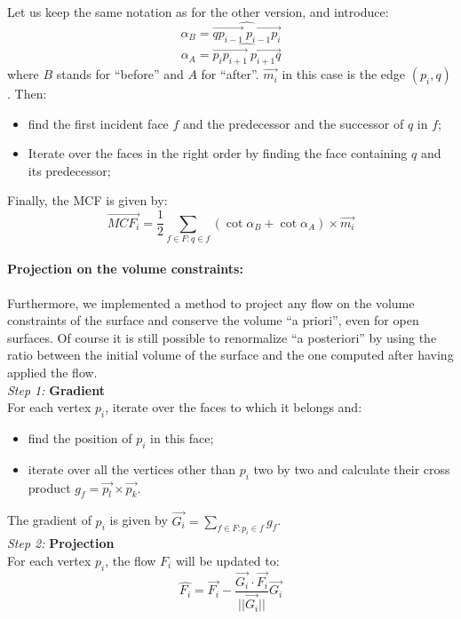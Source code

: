 \documentclass{article}
\begin{document}
Let us keep the same notation as for the other version, and introduce:
\begin{equation*}
  \alpha_B = \widehat{\overrightarrow{q p_{i-1}} ~ \overrightarrow{p_{i-1} p_{i}}}
\end{equation*}
\begin{equation*}
  \alpha_A = \widehat{\overrightarrow{p_i p_{i+1}} ~ \overrightarrow{p_{i+1} q}}
\end{equation*}
where $B$ stands for ``before'' and $A$ for ``after''. $\overrightarrow{m_i}$ in
this case is the edge $(p_i, q)$. Then:
\begin{itemize}
  \item find the first incident face $f$ and the predecessor and the successor of $q$ in $f$;
  \item Iterate over the faces in the right order by finding the face containing $q$ and its predecessor;
\end{itemize}
Finally, the MCF is given by:
\begin{equation*}
  \overrightarrow{MCF_i} = \frac{1}{2} \sum_{f \in F : q \in f} (\cot{\alpha_B} + \cot{\alpha_A}) \times \overrightarrow{m_i}
\end{equation*}

\paragraph*{Projection on the volume constraints:}
Furthermore, we implemented a method to project any flow on the volume constraints
of the surface and conserve the volume ``a priori'', even for open surfaces.
Of course it is still possible to renormalize ``a posteriori'' by using
the ratio between the initial volume of the surface and the one computed
after having applied the flow.\\
\textit{Step 1:} \textbf{Gradient}\\
For each vertex $p_i$, iterate over the faces to which it belongs and:
\begin{itemize}
  \item find the position of $p_i$ in this face;
  \item iterate over all the vertices other than $p_i$ two by two and calculate their cross product $g_f = \overrightarrow{p_l} \times \overrightarrow{p_k} $.
\end{itemize}
The gradient of $p_i$ is given by $\overrightarrow{G_i} = \sum_{f \in F : p_i \in f} g_f$.\\
\textit{Step 2:} \textbf{Projection}\\
For each vertex $p_i$, the flow $F_i$ will be updated to:
\begin{equation*}
  \hat{F_i} = \overrightarrow{F_i} -
  \frac{\overrightarrow{G_i} \cdot \overrightarrow{F_i}}
    {||\overrightarrow{G_i}||}
  \overrightarrow{G_i}
\end{equation*}
\end{document}
